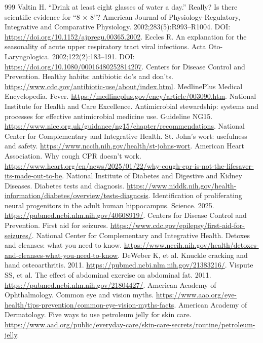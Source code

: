 \documentclass[11pt,oneside]{book}
\begin{document}
\begin{thebibliography}{999}
Valtin H. ``Drink at least eight glasses of water a day.'' Really? Is there scientific evidence for ``8 $\times$ 8''? American Journal of Physiology-Regulatory, Integrative and Comparative Physiology. 2002;283(5):R993--R1004. DOI: \url{https://doi.org/10.1152/ajpregu.00365.2002}.
Eccles R. An explanation for the seasonality of acute upper respiratory tract viral infections. Acta Oto-Laryngologica. 2002;122(2):183--191. DOI: \url{https://doi.org/10.1080/00016480252814207}.
Centers for Disease Control and Prevention. Healthy habits: antibiotic do's and don'ts. \url{https://www.cdc.gov/antibiotic-use/about/index.html}.
MedlinePlus Medical Encyclopedia. Fever. \url{https://medlineplus.gov/ency/article/003090.htm}.
National Institute for Health and Care Excellence. Antimicrobial stewardship: systems and processes for effective antimicrobial medicine use. Guideline NG15. \url{https://www.nice.org.uk/guidance/ng15/chapter/recommendations}.
National Center for Complementary and Integrative Health. St. John's wort: usefulness and safety. \url{https://www.nccih.nih.gov/health/st-johns-wort}.
American Heart Association. Why cough CPR doesn't work. \url{https://www.heart.org/en/news/2025/01/22/why-cough-cpr-is-not-the-lifesaver-its-made-out-to-be}.
National Institute of Diabetes and Digestive and Kidney Diseases. Diabetes tests and diagnosis. \url{https://www.niddk.nih.gov/health-information/diabetes/overview/tests-diagnosis}.
Identification of proliferating neural progenitors in the adult human hippocampus. Science. 2025. \url{https://pubmed.ncbi.nlm.nih.gov/40608919/}.
Centers for Disease Control and Prevention. First aid for seizures. \url{https://www.cdc.gov/epilepsy/first-aid-for-seizures/}.
National Center for Complementary and Integrative Health. Detoxes and cleanses: what you need to know. \url{https://www.nccih.nih.gov/health/detoxes-and-cleanses-what-you-need-to-know}.
DeWeber K, et al. Knuckle cracking and hand osteoarthritis. 2011. \url{https://pubmed.ncbi.nlm.nih.gov/21383216/}.
Vispute SS, et al. The effect of abdominal exercise on abdominal fat. 2011. \url{https://pubmed.ncbi.nlm.nih.gov/21804427/}.
American Academy of Ophthalmology. Common eye and vision myths. \url{https://www.aao.org/eye-health/tips-prevention/common-eye-vision-myths-facts}.
American Academy of Dermatology. Five ways to use petroleum jelly for skin care. \url{https://www.aad.org/public/everyday-care/skin-care-secrets/routine/petroleum-jelly}.

\end{thebibliography}
\end{document}
